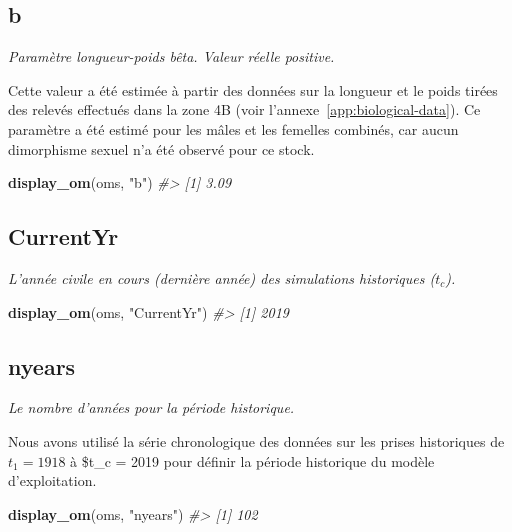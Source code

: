 \documentclass[11pt]{book}
\newenvironment{Shaded}{\begin{snugshade}}{\end{snugshade}}
\newcommand{\CommentTok}[1]{\textcolor[rgb]{0.56,0.35,0.01}{\textit{#1}}}
\newcommand{\KeywordTok}[1]{\textcolor[rgb]{0.13,0.29,0.53}{\textbf{#1}}}
\newcommand{\NormalTok}[1]{#1}
\newcommand{\StringTok}[1]{\textcolor[rgb]{0.31,0.60,0.02}{#1}}
\begin{document}
\subsection{b}

\emph{Paramètre longueur-poids bêta. Valeur réelle positive.}

Cette valeur a été estimée à partir des données sur la longueur et le poids tirées des relevés effectués dans la zone 4B (voir l'annexe~\ref{app:biological-data}). Ce paramètre a été estimé pour les mâles et les femelles combinés, car aucun dimorphisme sexuel n'a été observé pour ce stock.
\begin{Shaded}
\begin{Highlighting}[]
\KeywordTok{display_om}\NormalTok{(oms, }\StringTok{"b"}\NormalTok{)}
\CommentTok{#> [1] 3.09}
\end{Highlighting}
\end{Shaded}
\label{app:desc-fleet-yelloweye}

\label{app:desc-fleet-currentyr-yelloweye}
\subsection{CurrentYr}

\emph{L'année civile en cours (dernière année) des simulations historiques (\(t_c\)).}
\begin{Shaded}
\begin{Highlighting}[]
\KeywordTok{display_om}\NormalTok{(oms, }\StringTok{"CurrentYr"}\NormalTok{)}
\CommentTok{#> [1] 2019}
\end{Highlighting}
\end{Shaded}
\label{app:desc-fleet-nyears-yelloweye}
\subsection{nyears}

\emph{Le nombre d'années pour la période historique.}

Nous avons utilisé la série chronologique des données sur les prises historiques de \(t_1 = 1918\) à \$t\_c = 2019 pour définir la période historique du modèle d'exploitation.
\begin{Shaded}
\begin{Highlighting}[]
\KeywordTok{display_om}\NormalTok{(oms, }\StringTok{"nyears"}\NormalTok{)}
\CommentTok{#> [1] 102}
\end{Highlighting}
\end{Shaded}
\label{app:desc-fleet-selectivity-yelloweye}
\end{document}
